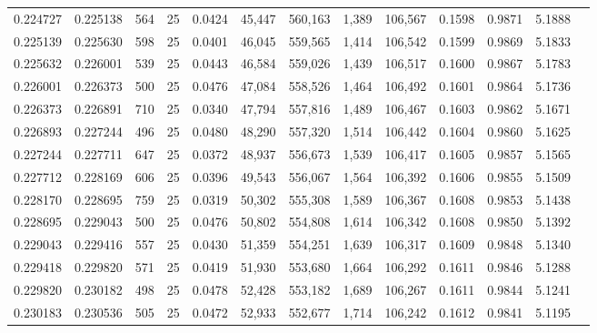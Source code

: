 \begin{tabular}{rrrrrrrrrrrrr}
0.224727 & 0.225138 &   564 &  25 &                                     0.0424 &  45,447 & 560,163 &   1,389 & 106,567 & 0.1598 & 0.9871 & 5.1888 \\
0.225139 & 0.225630 &   598 &  25 &                                     0.0401 &  46,045 & 559,565 &   1,414 & 106,542 & 0.1599 & 0.9869 & 5.1833 \\
0.225632 & 0.226001 &   539 &  25 &                                     0.0443 &  46,584 & 559,026 &   1,439 & 106,517 & 0.1600 & 0.9867 & 5.1783 \\
0.226001 & 0.226373 &   500 &  25 &                                     0.0476 &  47,084 & 558,526 &   1,464 & 106,492 & 0.1601 & 0.9864 & 5.1736 \\
0.226373 & 0.226891 &   710 &  25 &                                     0.0340 &  47,794 & 557,816 &   1,489 & 106,467 & 0.1603 & 0.9862 & 5.1671 \\
0.226893 & 0.227244 &   496 &  25 &                                     0.0480 &  48,290 & 557,320 &   1,514 & 106,442 & 0.1604 & 0.9860 & 5.1625 \\
0.227244 & 0.227711 &   647 &  25 &                                     0.0372 &  48,937 & 556,673 &   1,539 & 106,417 & 0.1605 & 0.9857 & 5.1565 \\
0.227712 & 0.228169 &   606 &  25 &                                     0.0396 &  49,543 & 556,067 &   1,564 & 106,392 & 0.1606 & 0.9855 & 5.1509 \\
0.228170 & 0.228695 &   759 &  25 &                                     0.0319 &  50,302 & 555,308 &   1,589 & 106,367 & 0.1608 & 0.9853 & 5.1438 \\
0.228695 & 0.229043 &   500 &  25 &                                     0.0476 &  50,802 & 554,808 &   1,614 & 106,342 & 0.1608 & 0.9850 & 5.1392 \\
0.229043 & 0.229416 &   557 &  25 &                                     0.0430 &  51,359 & 554,251 &   1,639 & 106,317 & 0.1609 & 0.9848 & 5.1340 \\
0.229418 & 0.229820 &   571 &  25 &                                     0.0419 &  51,930 & 553,680 &   1,664 & 106,292 & 0.1611 & 0.9846 & 5.1288 \\
0.229820 & 0.230182 &   498 &  25 &                                     0.0478 &  52,428 & 553,182 &   1,689 & 106,267 & 0.1611 & 0.9844 & 5.1241 \\
0.230183 & 0.230536 &   505 &  25 &                                     0.0472 &  52,933 & 552,677 &   1,714 & 106,242 & 0.1612 & 0.9841 & 5.1195 \\

\end{tabular}
